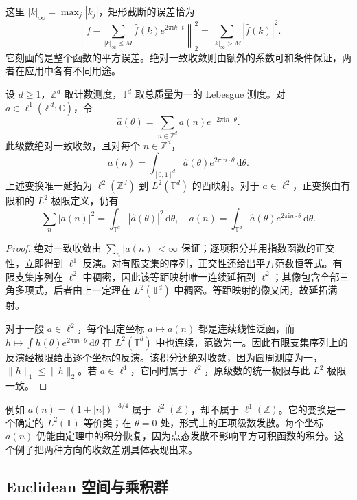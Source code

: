 这里 \(|k|_\infty=\max_j|k_j|\)，矩形截断的误差恰为
\[
 \left\|f-\sum_{|k|_\infty\le M}\widehat f(k)e^{2\pi\mathrm i k\cdot t}\right\|_2^2
 =\sum_{|k|_\infty>M}|\widehat f(k)|^2.
\]
它刻画的是整个函数的平方误差。绝对一致收敛则由额外的系数可和条件保证，两者在应用中各有不同用途。

\begin{theorem}\label{b2:thm:I4-lattice-fourier}
设 \(d\ge1\)，\(\mathbb Z^d\) 取计数测度，\(\mathbb T^d\) 取总质量为一的 Lebesgue 测度。对 \(a\in\ell^1(\mathbb Z^d;\mathbb C)\)，令
\[
 \widehat a(\theta)=\sum_{n\in\mathbb Z^d}a(n)e^{-2\pi\mathrm i n\cdot\theta}.
\]
此级数绝对一致收敛，且对每个 \(n\in\mathbb Z^d\)，
\[
 a(n)=\int_{[0,1]^d}\widehat a(\theta)
                    e^{2\pi\mathrm i n\cdot\theta}\,\mathrm d\theta.
\]
上述变换唯一延拓为 \(\ell^2(\mathbb Z^d)\) 到 \(L^2(\mathbb T^d)\) 的酉映射。对于 \(a\in\ell^2\)，正变换由有限和的 \(L^2\) 极限定义，仍有
\[
 \sum_n|a(n)|^2=\int_{\mathbb T^d}|\widehat a(\theta)|^2\,\mathrm d\theta,
 \quad
 a(n)=\int_{\mathbb T^d}\widehat a(\theta)e^{2\pi\mathrm i n\cdot\theta}\,\mathrm d\theta.
\]
\end{theorem}
\begin{proof}
绝对一致收敛由 \(\sum_n|a(n)|<\infty\) 保证；逐项积分并用指数函数的正交性，立即得到 \(\ell^1\) 反演。对有限支集的序列，正交性还给出平方范数恒等式。有限支集序列在 \(\ell^2\) 中稠密，因此该等距映射唯一连续延拓到 \(\ell^2\)；其像包含全部三角多项式，后者由上一定理在 \(L^2(\mathbb T^d)\) 中稠密。等距映射的像又闭，故延拓满射。

对于一般 \(a\in\ell^2\)，每个固定坐标 \(a\mapsto a(n)\) 都是连续线性泛函，而 \(h\mapsto\int h(\theta)e^{2\pi\mathrm i n\cdot\theta}\,\mathrm d\theta\) 在 \(L^2(\mathbb T^d)\) 中也连续，范数为一。因此有限支集序列上的反演经极限给出逐个坐标的反演。该积分还绝对收敛，因为圆周测度为一，\(\|h\|_1\le\|h\|_2\)。若 \(a\in\ell^1\)，它同时属于 \(\ell^2\)，原级数的统一极限与此 \(L^2\) 极限一致。
\end{proof}

例如 \(a(n)=(1+|n|)^{-3/4}\) 属于 \(\ell^2(\mathbb Z)\)，却不属于 \(\ell^1(\mathbb Z)\)。它的变换是一个确定的 \(L^2(\mathbb T)\) 等价类；在 \(\theta=0\) 处，形式上的正项级数发散。每个坐标 \(a(n)\) 仍能由定理中的积分恢复，因为点态发散不影响平方可积函数的积分。这个例子把两种方向的收敛差别具体表现出来。

\subsection{Euclidean 空间与乘积群}
\label{b2:subsec:I20403}

